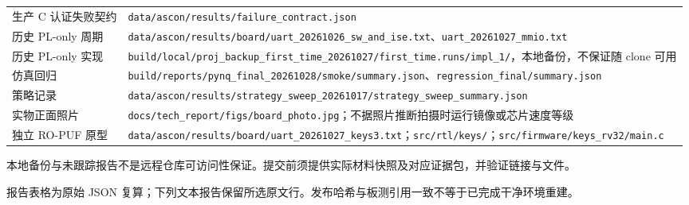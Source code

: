 {\begin{longtable}{@{}>{\raggedright\arraybackslash}p{}>{\raggedright\arraybackslash}p{}@{}}
生产 C 认证失败契约 & \texttt{data/\allowbreak{}ascon/\allowbreak{}results/\allowbreak{}failure\_\allowbreak{}\allowbreak{}contract.\allowbreak{}json} \\
历史 PL-only 周期 & \texttt{data/\allowbreak{}ascon/\allowbreak{}results/\allowbreak{}board/\allowbreak{}uart\_\allowbreak{}\allowbreak{}20261026\_\allowbreak{}\allowbreak{}sw\_\allowbreak{}\allowbreak{}and\_\allowbreak{}\allowbreak{}ise.\allowbreak{}txt}、\texttt{uart\_\allowbreak{}\allowbreak{}20261027\_\allowbreak{}\allowbreak{}mmio.\allowbreak{}txt} \\
历史 PL-only 实现 & \texttt{build/\allowbreak{}local/\allowbreak{}proj\_\allowbreak{}\allowbreak{}backup\_\allowbreak{}\allowbreak{}first\_\allowbreak{}\allowbreak{}time\_\allowbreak{}\allowbreak{}20261027/\allowbreak{}first\_\allowbreak{}\allowbreak{}time.\allowbreak{}runs/\allowbreak{}impl\_\allowbreak{}\allowbreak{}1/\allowbreak{}}，本地备份，不保证随 clone 可用 \\
仿真回归 & \texttt{build/\allowbreak{}reports/\allowbreak{}pynq\_\allowbreak{}\allowbreak{}final\_\allowbreak{}\allowbreak{}20261028/\allowbreak{}smoke/\allowbreak{}summary.\allowbreak{}json}、\texttt{regression\_\allowbreak{}\allowbreak{}final/\allowbreak{}summary.\allowbreak{}json} \\
33 策略记录 & \texttt{data/\allowbreak{}ascon/\allowbreak{}results/\allowbreak{}strategy\_\allowbreak{}\allowbreak{}sweep\_\allowbreak{}\allowbreak{}20261017/\allowbreak{}strategy\_\allowbreak{}\allowbreak{}sweep\_\allowbreak{}\allowbreak{}summary.\allowbreak{}json} \\
实物正面照片 & \texttt{docs/\allowbreak{}tech\_\allowbreak{}\allowbreak{}report/\allowbreak{}figs/\allowbreak{}board\_\allowbreak{}\allowbreak{}photo.\allowbreak{}jpg}；不据照片推断拍摄时运行镜像或芯片速度等级 \\
独立 RO-PUF 原型 & \texttt{data/\allowbreak{}ascon/\allowbreak{}results/\allowbreak{}board/\allowbreak{}uart\_\allowbreak{}\allowbreak{}20261027\_\allowbreak{}\allowbreak{}keys3.\allowbreak{}txt}；\texttt{src/\allowbreak{}rtl/\allowbreak{}keys/\allowbreak{}}；\texttt{src/\allowbreak{}firmware/\allowbreak{}keys\_\allowbreak{}\allowbreak{}rv32/\allowbreak{}main.\allowbreak{}c} \\
\bottomrule
\end{longtable}
}

本地备份与未跟踪报告不是远程仓库可访问性保证。提交前须提供实际材料快照及对应证据包，并验证链接与文件。

报告表格为原始 JSON 复算；下列文本报告保留所选原文行。发布哈希与板测引用一致不等于已完成干净环境重建。

